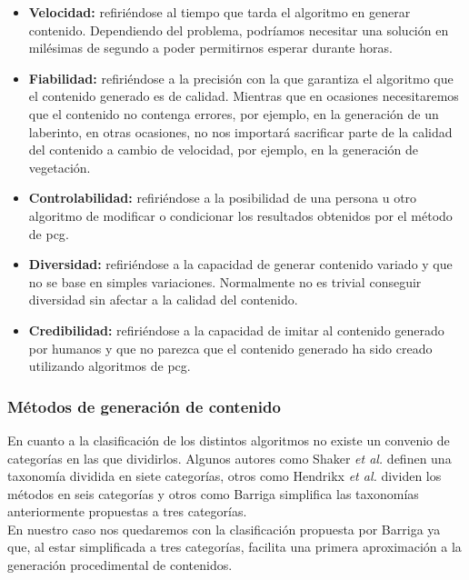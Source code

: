 \begin{itemize}
    \item \textbf{Velocidad:} refiriéndose al tiempo que tarda el algoritmo en generar contenido. Dependiendo del problema, podríamos necesitar una solución en milésimas de segundo a poder permitirnos esperar durante horas.
    \item \textbf{Fiabilidad:} refiriéndose a la precisión con la que garantiza el algoritmo que el contenido generado es de calidad. Mientras que en ocasiones necesitaremos que el contenido no contenga errores, por ejemplo, en la generación de un laberinto, en otras ocasiones, no nos importará sacrificar parte de la calidad del contenido a cambio de velocidad, por ejemplo, en la generación de vegetación.
    \item \textbf{Controlabilidad:} refiriéndose a la posibilidad de una persona u otro algoritmo de modificar o condicionar los resultados obtenidos por el método de \acrshort{pcg}.
    \item \textbf{Diversidad:} refiriéndose a la capacidad de generar contenido variado y que no se base en simples variaciones. Normalmente no es trivial conseguir diversidad sin afectar a la calidad del contenido.
    \item \textbf{Credibilidad:} refiriéndose a la capacidad de imitar al contenido generado por humanos y que no parezca que el contenido generado ha sido creado utilizando algoritmos de \acrshort{pcg}.
\end{itemize}

\subsubsection{Métodos de generación de contenido}

En cuanto a la clasificación de los distintos algoritmos no existe un convenio de categorías en las que dividirlos. Algunos autores como Shaker \textit{et al.} \cite{shaker2016} definen una taxonomía dividida en siete categorías, otros como Hendrikx \textit{et al.} \cite{hendrikx2013} dividen los métodos en seis categorías y otros como Barriga \cite{barriga2019} simplifica las taxonomías anteriormente propuestas a tres categorías.\\

En nuestro caso nos quedaremos con la clasificación propuesta por Barriga ya que, al estar simplificada a tres categorías, facilita una primera aproximación a la generación procedimental de contenidos.\\

